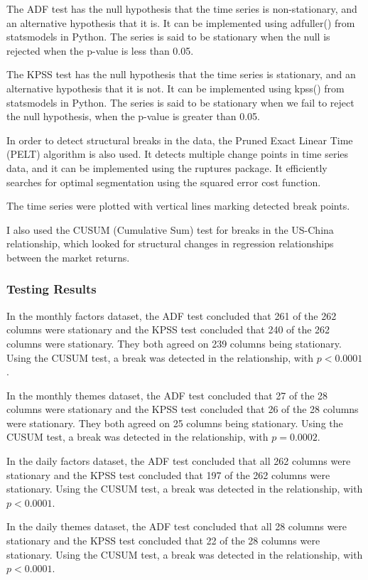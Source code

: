 The ADF test has the null hypothesis that the time series is non-stationary, and an alternative hypothesis that it is. It can be implemented using adfuller() from statsmodels in Python. The series is said to be stationary when the null is rejected when the p-value is less than 0.05.

The KPSS test has the null hypothesis that the time series is stationary, and an alternative hypothesis that it is not. It can be implemented using kpss() from statsmodels in Python. The series is said to be stationary when we fail to reject the null hypothesis, when the p-value is greater than 0.05.

In order to detect structural breaks in the data, the Pruned Exact Linear Time (PELT) algorithm is also used. It detects multiple change points in time series data, and it can be implemented using the ruptures package. It efficiently searches for optimal segmentation using the squared error cost function. 

The time series were plotted with vertical lines marking detected break points.

I also used the CUSUM (Cumulative Sum) test for breaks in the US-China relationship, which looked for structural changes in regression relationships between the market returns.

\subsubsection{Testing Results}

In the monthly factors dataset, the ADF test concluded that 261 of the 262 columns were stationary and the KPSS test concluded that 240 of the 262 columns were stationary. They both agreed on 239 columns being stationary. Using the CUSUM test, a break was detected in the relationship, with $p<0.0001$. 

In the monthly themes dataset, the ADF test concluded that 27 of the 28 columns were stationary and the KPSS test concluded that 26 of the 28 columns were stationary. They both agreed on 25 columns being stationary. Using the CUSUM test, a break was detected in the relationship, with $p=0.0002$. 

In the daily factors dataset, the ADF test concluded that all 262 columns were stationary and the KPSS test concluded that 197 of the 262 columns were stationary. Using the CUSUM test, a break was detected in the relationship, with $p<0.0001$.

In the daily themes dataset, the ADF test concluded that all 28 columns were stationary and the KPSS test concluded that 22 of the 28 columns were stationary. Using the CUSUM test, a break was detected in the relationship, with $p<0.0001$.

